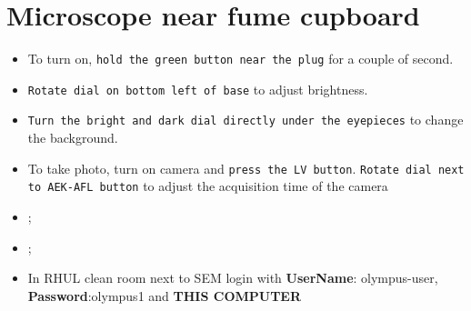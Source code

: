 \section{Microscope near fume cupboard\label{sec:micro}}
  \begin{itemize}
  	\item To turn on, \texttt{hold the green button near the plug} for a couple of second.
  	\item \texttt{Rotate dial on bottom left of base} to adjust brightness.
  	\item \texttt{Turn the bright and dark dial directly under the eyepieces} to change the background.
  	\item To take photo, turn on camera and \texttt{press the LV button}. \texttt{Rotate dial next to AEK-AFL button} to adjust the acquisition time of the camera
	  	\item {};
	\item {};
	\item In RHUL clean room next to SEM login with \textbf{UserName}: olympus-user, \textbf{Password}:olympus1 and \textbf{THIS COMPUTER } \ira {} \ira {} \ira {}  	
  \end{itemize}

 \newpage
 